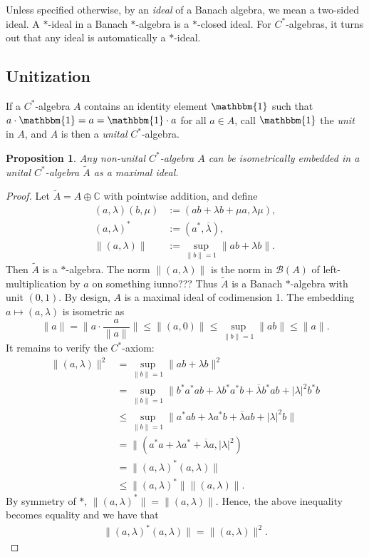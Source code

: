 \documentclass[12pt,a4paper]{amsart}
\theoremstyle{plain}
\newtheorem{prop}{Proposition}
\theoremstyle{definition}
\newcommand{\B}{\mathcal{B}}
\newcommand{\1}{\mathbbm{1}}
\newcommand{\C}{\mathbb{C}}
\begin{document}
Unless specified otherwise, by an \emph{ideal} of a Banach algebra, we mean a two-sided ideal.
A $\ast$-ideal in a Banach $\ast$-algebra is a $\ast$-closed ideal. 
For $C^\ast$-algebras, it turns out that any ideal is automatically a $\ast$-ideal.

\subsection{Unitization}
If a $C^\ast$-algebra $A$ contains an identity element $\1$ such that 
$a\cdot \1 = a = \1 \cdot a$ for all $a \in A$, call $\1$ the \emph{unit} 
in $A$, and $A$ is then a \emph{unital} $C^\ast$-algebra.

\begin{prop}
	Any non-unital $C^\ast$-algebra $A$ can be isometrically embedded 
	in a unital $C^\ast$-algebra $\tilde{A}$ as a maximal ideal.
\end{prop}
\begin{proof}
	Let $\tilde{A} = A \oplus \C$ with pointwise addition, and define
	\begin{align*}
		(a,\lambda) (b,\mu) &:= (ab+\lambda b + \mu a, \lambda \mu),		\\
		(a,\lambda)^\ast &:= (a^\ast,\overline{\lambda}),					\\
		\|(a,\lambda)\| &:= \sup_{\|b\|=1}{\|ab+\lambda b\|}.
	\end{align*}
	Then $\tilde{A}$ is a $\ast$-algebra. The norm $\|(a,\lambda)\|$ is the norm 
	in $\B(A)$ of left-multiplication by $a$ on something iunno???
	Thus $\tilde{A}$ is a Banach $\ast$-algebra with unit $(0,1)$. 
	By design, $A$ is a maximal ideal of codimension 1. 
	The embedding $a\mapsto(a,\lambda)$ is isometric as 
	\[
		\|a\| = \|a\cdot\frac{a}{\|a\|}\| \leq \|(a,0)\| \leq \sup_{\|b\|=1}{\|ab\|} \leq \|a\|.
	\]
	It remains to verify the $C^\ast$-axiom:
	\begin{align*}
				\|(a,\lambda)\|^2 
		&=		\sup_{\|b\|=1}{\|ab+\lambda b\|^2}								\\
		&=		\sup_{\|b\|=1}{\|b^\ast a^\ast ab 
								+\lambda b^\ast a^\ast b
								+\overline{\lambda}b^\ast a b
								+|\lambda|^2 b^\ast b}							\\
		&\leq	\sup_{\|b\|=1}{\|a^\ast ab 
								+\lambda a^\ast b
								+\overline{\lambda}a b
								+|\lambda|^2 b\|}									\\
		&=		\|(a^\ast a + \lambda a^\ast +\overline{\lambda}a,|\lambda|^2)	\\
		&= 		\|(a,\lambda)^\ast(a,\lambda)\|									\\
		&\leq	\|(a,\lambda)^\ast\| \|(a,\lambda)\|.
	\end{align*}
	By symmetry of $\ast$, $\|(a,\lambda)^\ast\| = \|(a,\lambda)\|$. 
	Hence, the above inequality becomes equality and we have that
	\begin{align*}
		\|(a,\lambda)^\ast(a,\lambda)\| = \|(a,\lambda)\|^2. 
	\end{align*}		
	
\end{proof}
\end{document}
